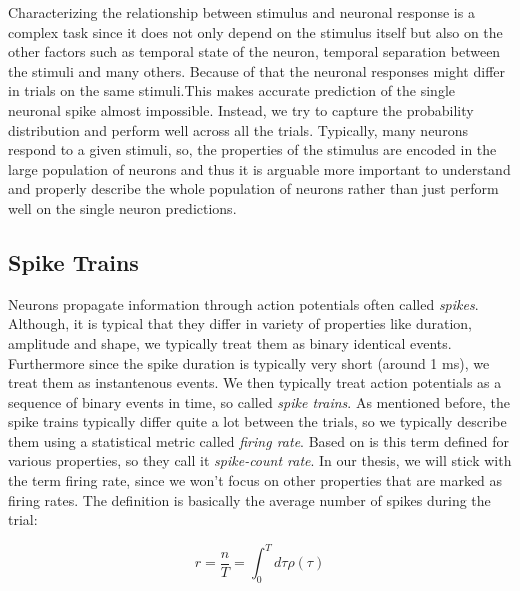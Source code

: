 Characterizing the relationship between stimulus and neuronal response is a complex
task since it does not only depend on the stimulus itself but also on the other 
factors such as temporal state of the neuron, temporal separation between the stimuli
and many others. Because of that the neuronal responses might differ in trials on 
the same stimuli.This makes accurate prediction of the single neuronal spike almost 
impossible. Instead, we try to capture the probability distribution and perform well 
across all the trials. Typically, many neurons respond to a given stimuli, so, 
the properties of the stimulus are encoded in the large population of neurons and thus 
it is arguable more important to understand and properly describe the whole 
population of neurons rather than just perform well on the single neuron predictions.

\subsection{Spike Trains}
\label{subsec:spike_trains}
Neurons propagate information through action potentials often called \emph{spikes}. 
Although, it is typical that they differ in variety of properties like duration, 
amplitude and shape, we typically 
treat them as binary identical events. Furthermore since the spike duration
is typically very short (around 1 ms), we treat them as instantenous events. We then
typically treat action potentials as a sequence of binary events in time, so called
\emph{spike trains}. As mentioned before, the spike trains typically differ quite 
a lot between the trials, so we typically describe them using a statistical metric 
called \emph{firing rate}. Based on \citet{dayan2005theoretical} is this term defined
for various properties, so they call it \emph{spike-count rate}. In our thesis, we 
will stick with the term firing rate, since we won't focus on other properties 
that are marked as firing rates. The definition is basically the average number of 
spikes during the trial:

$$r = \frac{n}{T} = \int_{0}^{T}d\tau \rho(\tau)$$


